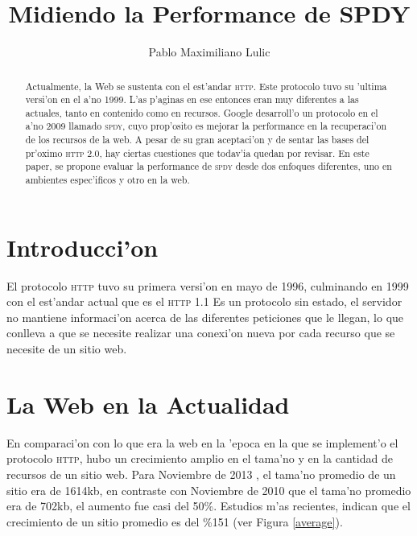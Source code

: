 \documentclass[a4paper,11pt,twocolumn]{article}
\begin{document}
\setlength{\columnsep}{25pt}

\title{Midiendo la Performance de SPDY}
\author{Pablo Maximiliano Lulic}

\maketitle

\begin{abstract} 
Actualmente, la Web se sustenta con el est'andar \textsc{http}. Este protocolo tuvo su 'ultima versi'on en el a'no 1999. L'as p'aginas en ese entonces eran muy diferentes a las actuales, tanto en contenido como en recursos. Google desarroll'o un protocolo en el a'no 2009 llamado \textsc{spdy}, cuyo prop'osito es mejorar la performance en la recuperaci'on de los recursos de la web. A pesar de su gran aceptaci'on y de sentar las bases del pr'oximo \textsc{http 2.0}, hay ciertas cuestiones que todav'ia quedan por revisar. En este paper, se propone evaluar la performance de \textsc{spdy} desde dos enfoques diferentes, uno en ambientes espec'ificos y otro en la web.
\end{abstract}

\section{Introducci'on}

El protocolo \textsc{http} tuvo su primera versi'on en mayo de 1996, culminando en 1999 con el est'andar actual que es el \textsc{http}  1.1 \cite{rfcHTTP} Es un protocolo sin estado, el servidor no mantiene informaci'on acerca de las diferentes peticiones que le llegan, lo que conlleva a que se necesite realizar una conexi'on nueva por cada recurso que se necesite de un sitio web.

\section{La Web en la Actualidad}

En comparaci'on con lo que era la web en la 'epoca en la que se implement'o el protocolo \textsc{http}, hubo un crecimiento amplio en el tama'no y en la cantidad de recursos de un sitio web. Para Noviembre de 2013 \cite{httpArchive}, el tama'no promedio de un sitio era de 1614kb, en contraste con Noviembre de 2010 que el tama'no promedio era de 702kb, el aumento fue casi del 50\%. Estudios m'as recientes, indican que el crecimiento de un sitio promedio es del \%151 \cite{tammy} (ver Figura \ref{average}).
\end{document}
